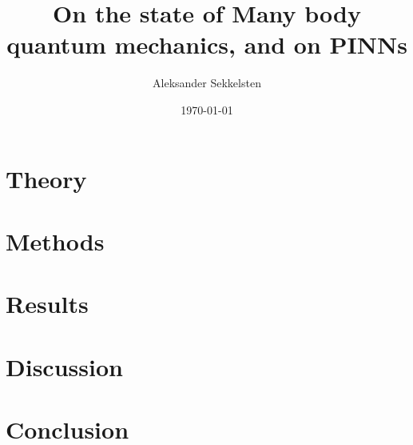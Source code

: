 \documentclass{report}
\title{On the state of Many body quantum mechanics, and on PINNs}
\author{Aleksander Sekkelsten}
\date{\today}
\numberwithin{equation}{chapter}
\begin{document}
\maketitle
\tableofcontents
\part{Theory}


\part{Methods}


\part{Results}


\part{Discussion}


\part{Conclusion}


%
 

\end{document}
